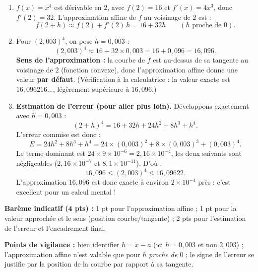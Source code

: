 \documentclass[11pt]{article}
\begin{document}
\begin{corrige}
\begin{enumerate}
    \item $f(x)=x^4$ est dérivable en $2$, avec $f(2)=16$ et $f'(x)=4x^3$, donc $f'(2)=32$. L'approximation affine de $f$ au voisinage de $2$ est :
    \[
    f(2+h)\approx f(2)+f'(2)\,h=16+32h \qquad (h \text{ proche de } 0).
    \]
    \item Pour $(2,003)^4$, on pose $h=0,003$ :
    \[
    (2,003)^4\approx 16+32\times 0,003=16+0,096=16,096.
    \]
    \textbf{Sens de l'approximation :} la courbe de $f$ est au-dessus de sa tangente au voisinage de $2$ (fonction convexe), donc l'approximation affine donne une valeur \textbf{par défaut}. (Vérification à la calculatrice : la valeur exacte est $16{,}096216\ldots$, légèrement supérieure à $16{,}096$.)
    \item \textbf{Estimation de l'erreur (pour aller plus loin).} Développons exactement avec $h=0,003$ :
    \[
    (2+h)^4=16+32h+24h^2+8h^3+h^4.
    \]
    L'erreur commise est donc :
    \[
    E=24h^2+8h^3+h^4=24\times(0,003)^2+8\times(0,003)^3+(0,003)^4.
    \]
    Le terme dominant est $24\times 9\times 10^{-6}=2,16\times 10^{-4}$, les deux suivants sont négligeables ($2,16\times 10^{-7}$ et $8,1\times 10^{-11}$). D'où :
    \[
    16{,}096\le (2,003)^4\le 16{,}09622.
    \]
    L'approximation $16{,}096$ est donc exacte à environ $2\times 10^{-4}$ près : c'est excellent pour un calcul mental !
\end{enumerate}

\textbf{Barème indicatif (4 pts) :} 1 pt pour l'approximation affine ; 1 pt pour la valeur approchée et le sens (position courbe/tangente) ; 2 pts pour l'estimation de l'erreur et l'encadrement final.

\textbf{Points de vigilance :} bien identifier $h=x-a$ (ici $h=0,003$ et non $2,003$) ; l'approximation affine n'est valable que pour $h$ \emph{proche de $0$} ; le signe de l'erreur se justifie par la position de la courbe par rapport à sa tangente.
\end{corrige}
\end{document}
